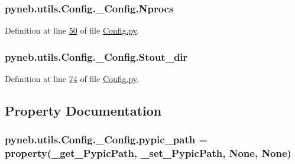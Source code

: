 \hypertarget{classpyneb_1_1utils_1_1_config_1_1___config_af47651c816db6a79ea1ba34e1594e2d4}{
\subsubsection[{Nprocs}]{\setlength{\rightskip}{0pt plus 5cm}pyneb.\-utils.\-Config.\-\_\-\-Config.\-Nprocs}}\label{classpyneb_1_1utils_1_1_config_1_1___config_af47651c816db6a79ea1ba34e1594e2d4}


Definition at line \hyperlink{_config_8py_source_l00050}{50} of file \hyperlink{_config_8py_source}{Config.\-py}.

\hypertarget{classpyneb_1_1utils_1_1_config_1_1___config_a3da6d1f2c9c7a10379adb0d5a48a594a}{
\subsubsection[{Stout\-\_\-dir}]{\setlength{\rightskip}{0pt plus 5cm}pyneb.\-utils.\-Config.\-\_\-\-Config.\-Stout\-\_\-dir}}\label{classpyneb_1_1utils_1_1_config_1_1___config_a3da6d1f2c9c7a10379adb0d5a48a594a}


Definition at line \hyperlink{_config_8py_source_l00074}{74} of file \hyperlink{_config_8py_source}{Config.\-py}.



\subsection{Property Documentation}
\hypertarget{classpyneb_1_1utils_1_1_config_1_1___config_a5276927da3588ffb009fd79f282c6d3c}{
\subsubsection[{pypic\-\_\-path}]{\setlength{\rightskip}{0pt plus 5cm}pyneb.\-utils.\-Config.\-\_\-\-Config.\-pypic\-\_\-path = property({\bf \-\_\-get\-\_\-\-Pypic\-Path}, {\bf \-\_\-set\-\_\-\-Pypic\-Path}, None, None)\hspace{0.3cm}{\ttfamily [static]}}}\label{classpyneb_1_1utils_1_1_config_1_1___config_a5276927da3588ffb009fd79f282c6d3c}


